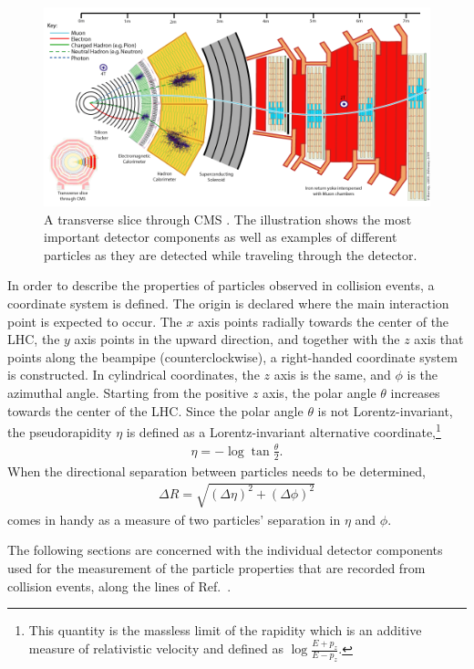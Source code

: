 \begin{figure}
	\includegraphics[width=\textwidth]{Detector/CMS_Slice}
	\centering
	\caption{A transverse slice through CMS \cite{CMSslice}. The illustration shows the most important detector components as well as examples of different particles as they are detected while traveling through the detector.}
	\label{fig:CMS}
\end{figure}

In order to describe the properties of particles observed in collision events, a coordinate system is defined. The origin is declared where the main interaction point is expected to occur. The $x$ axis points radially towards the center of the LHC, the $y$ axis points in the upward direction, and together with the $z$ axis that points along the beampipe (counterclockwise), a right-handed coordinate system is constructed. In cylindrical coordinates, the $z$ axis is the same, and $\phi$ is the azimuthal angle. Starting from the positive $z$ axis, the polar angle $\theta$ increases towards the center of the LHC. Since the polar angle $\theta$ is not Lorentz-invariant, the pseudorapidity $\eta$ is defined as a Lorentz-invariant alternative coordinate,\footnote{This quantity is the massless limit of the rapidity which is an additive measure of relativistic velocity and defined as $\log \frac{E + p_z}{E - p_z}$.}
\begin{eqnarray}
	\eta = - \log \tan \frac{\theta}{2}.
\end{eqnarray}
When the directional separation between particles needs to be determined,
\begin{eqnarray}
	\Delta R = \sqrt{(\Delta \eta)^2 + (\Delta \phi)^2}
\end{eqnarray}
comes in handy as a measure of two particles' separation in $\eta$ and $\phi$.

The following sections are concerned with the individual detector components used for the measurement of the particle properties that are recorded from collision events, along the lines of Ref.~\cite{Xie:1455454}.

